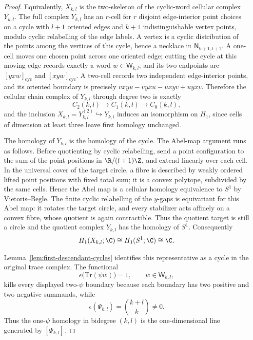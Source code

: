 \documentclass[11pt]{memoir}
\begin{document}
\begin{proof}
  Equivalently, $X_{k,l}$ is the two-skeleton of the cyclic-word cellular
  complex \(Y_{k,l}\).  The full complex \(Y_{k,l}\) has an \(r\)-cell for
  \(r\) disjoint edge-interior point choices on a cycle with \(l+1\)
  oriented edges and \(k+1\) indistinguishable vertex points, modulo cyclic
  relabelling of the edge labels.  A vertex is a cyclic distribution of the
  points among the vertices of this cycle, hence a necklace in
  \(\mathsf N_{k+1,l+1}\).  A one-cell moves one chosen point across one oriented
  edge; cutting the cycle at this moving edge records exactly a word
  $w\in\mathsf W_{k,l}$, and its two endpoints are
  $[yxw]_{\mathrm{cyc}}$ and $[xyw]_{\mathrm{cyc}}$.  A two-cell records two
  independent edge-interior points, and its oriented boundary is precisely
  $vxyu-vyxu-uxyv+uyxv$. Therefore the cellular chain complex of $Y_{k,l}$
  through degree two is exactly
  $$C_2(k,l)\longrightarrow C_1(k,l)\longrightarrow C_0(k,l),$$
  and the inclusion $X_{k,l}=Y_{k,l}^{(2)}\hookrightarrow Y_{k,l}$ induces an
  isomorphism on $H_1$, since cells of dimension at least three leave
  first homology unchanged.

  The homology of $Y_{k,l}$ is the homology of the cycle.  The
  Abel-map argument runs as follows.  Before quotienting
  by cyclic relabelling, send a point configuration to the sum of the
  point positions in
  $\R/(l+1)\Z$, and extend linearly over each cell. In the
  universal cover of the target circle, a fibre is described by weakly ordered
  lifted point positions with fixed total sum; it is a convex polytope, subdivided
  by the same cells. Hence the Abel map is a cellular homology
  equivalence to $S^1$ by Vietoris--Begle. The finite cyclic relabelling of the $y$-gaps is
  equivariant for this Abel map: it rotates the target circle, and every
  stabilizer acts affinely on a convex fibre, whose quotient is again
  contractible. Thus the quotient target is still a circle and the quotient
  complex $Y_{k,l}$ has the homology of $S^1$. Consequently
  $$H_1(X_{k,l};\C)\cong H_1(S^1;\C)\cong\C.$$

  Lemma~\ref{lem:first-descendant-cycles} identifies this representative as a
  cycle in the original trace complex. The functional
  $$\epsilon\bigl(\mathrm{Tr}(\psi w)\bigr)=1,\qquad w\in\mathsf W_{k,l},$$
  kills every displayed two-$\psi$ boundary because each boundary has two
  positive and two negative summands, while
  $$\epsilon(\Psi_{k,l})=\binom{k+l}{k}\neq0.$$
  Thus the one-$\psi$ homology in bidegree $(k,l)$ is the one-dimensional line
  generated by $[\Psi_{k,l}]$.
\end{proof}
\end{document}
